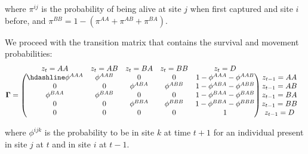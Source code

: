 \documentclass[
  12pt,
]{krantz}
\begin{document}
where \(\pi^{ij}\) is the probability of being alive at site \(j\) when first captured and site \(i\) before, and \(\pi^{BB} = 1 - (\pi^{AA} + \pi^{AB} + \pi^{BA})\).

We proceed with the transition matrix that contains the survival and movement probabilities:
\[\begin{matrix}
& \\
\mathbf{\Gamma} =
\left ( \vphantom{ \begin{matrix} 12 \\ 12 \\ 12 \\ 12 \\ 12\end{matrix} } \right .
\end{matrix}
\hspace{-1.2em}
\begin{matrix}
z_t=AA & z_t=AB & z_t=BA & z_t=BB & z_t=D \\ \hdashline
\phi^{AAA} & \phi^{AAB} & 0 & 0 & 1 - \phi^{AAA} - \phi^{AAB}\\
0 & 0 & \phi^{ABA} & \phi^{ABB} & 1 - \phi^{ABA} - \phi^{ABB}\\
\phi^{BAA} & \phi^{BAB} & 0 & 0 & 1 - \phi^{BAA} - \phi^{BAB}\\
0 & 0 & \phi^{BBA} & \phi^{BBB} & 1 - \phi^{BBA} - \phi^{BBB}\\
0 & 0 & 0 & 0 & 1
\end{matrix}
\hspace{-0.2em}
\begin{matrix}
& \\
\left . \vphantom{ \begin{matrix} 12 \\ 12 \\ 12 \\ 12 \\ 12\end{matrix} } \right )
\begin{matrix}
z_{t-1}=AA \\ z_{t-1}=AB \\ z_{t-1}=BA \\ z_{t-1}=BB \\ z_{t-1}=D 
\end{matrix}
\end{matrix}\]

where \(\phi^{ijk}\) is the probability to be in site \(k\) at time \(t + 1\) for an individual
present in site \(j\) at \(t\) and in site \(i\) at \(t - 1\).
\end{document}
